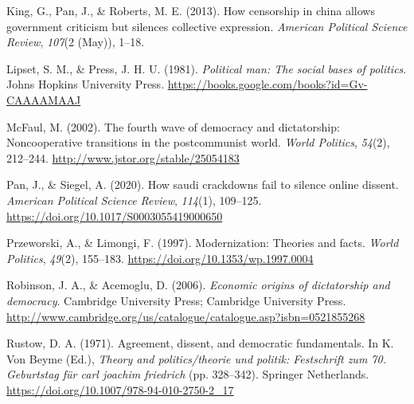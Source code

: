 \documentclass[12pt,]{article}
\begin{document}
\leavevmode\hypertarget{ref-king}{}%
King, G., Pan, J., \& Roberts, M. E. (2013). How censorship in china
allows government criticism but silences collective expression.
\emph{American Political Science Review}, \emph{107}(2 (May)), 1--18.

\leavevmode\hypertarget{ref-lipset}{}%
Lipset, S. M., \& Press, J. H. U. (1981). \emph{Political man: The
social bases of politics}. Johns Hopkins University Press.
\url{https://books.google.com/books?id=Gv-CAAAAMAAJ}

\leavevmode\hypertarget{ref-mcfaul}{}%
McFaul, M. (2002). The fourth wave of democracy and dictatorship:
Noncooperative transitions in the postcommunist world. \emph{World
Politics}, \emph{54}(2), 212--244.
\url{http://www.jstor.org/stable/25054183}

\leavevmode\hypertarget{ref-pan2020}{}%
Pan, J., \& Siegel, A. (2020). How saudi crackdowns fail to silence
online dissent. \emph{American Political Science Review}, \emph{114}(1),
109--125. \url{https://doi.org/10.1017/S0003055419000650}

\leavevmode\hypertarget{ref-przeworski}{}%
Przeworski, A., \& Limongi, F. (1997). Modernization: Theories and
facts. \emph{World Politics}, \emph{49}(2), 155--183.
\url{https://doi.org/10.1353/wp.1997.0004}

\leavevmode\hypertarget{ref-robinson}{}%
Robinson, J. A., \& Acemoglu, D. (2006). \emph{Economic origins of
dictatorship and democracy}. Cambridge University Press; Cambridge
University Press.
\url{http://www.cambridge.org/us/catalogue/catalogue.asp?isbn=0521855268}

\leavevmode\hypertarget{ref-rustow}{}%
Rustow, D. A. (1971). Agreement, dissent, and democratic fundamentals.
In K. Von Beyme (Ed.), \emph{Theory and politics/theorie und politik:
Festschrift zum 70. Geburtstag für carl joachim friedrich} (pp.
328--342). Springer Netherlands.
\url{https://doi.org/10.1007/978-94-010-2750-2_17}





\newpage
\singlespacing 
\end{document}
